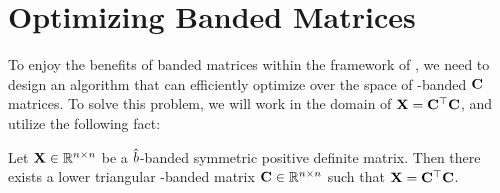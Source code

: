 \documentclass{article}
\begin{document}


\section{Optimizing Banded Matrices}\label{sec:optimizing}

To enjoy the benefits of banded matrices within the framework of \MFFTRL, we need to design an algorithm that can efficiently optimize over the space of \bands-banded $\mathbf{C}$ matrices.  To solve this problem, we will work in the domain of $\mathbf{X} = \mathbf{C}^\top \mathbf{C}$, and utilize the following fact:

\begin{prop} \label{thm:banded-cholesky}
Let $\mathbf{X} \in \mathbb{R}^{n \times n}$ be a $\hat{b}$-banded symmetric positive definite matrix.  Then there exists a lower triangular \bands-banded matrix $\mathbf{C} \in \mathbb{R}^{n \times n}$ such that $\mathbf{X} = \mathbf{C}^\top \mathbf{C}$.
\end{prop}
\end{document}
